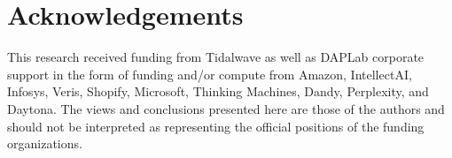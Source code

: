 \documentclass[11pt]{article}
\begin{document}
% 
% 

\makeatletter
\ifacl@anonymize\else
\section*{Acknowledgements}
This research received funding from Tidalwave as well as DAPLab corporate support in the form of funding and/or compute from Amazon, IntellectAI, Infosys, Veris, Shopify, Microsoft, Thinking Machines, Dandy, Perplexity, and Daytona.
The views and conclusions presented here are those of the authors and should not be interpreted as representing the official positions of the funding organizations.
\fi
\makeatother

%



\appendix
\end{document}
